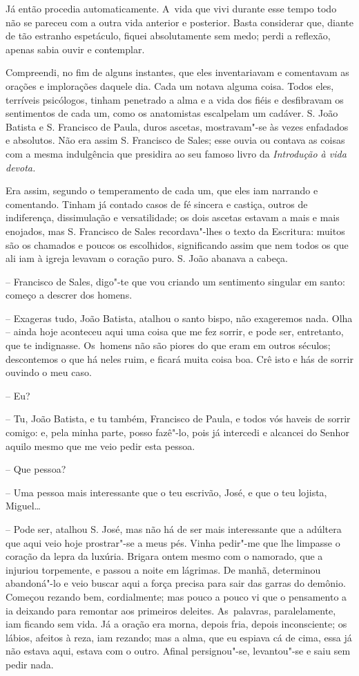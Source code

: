 Já então procedia automaticamente. A~vida que vivi durante esse tempo
todo não se pareceu com a outra vida anterior e posterior. Basta
considerar que, diante de tão estranho espetáculo, fiquei absolutamente
sem medo; perdi a reflexão, apenas sabia ouvir e contemplar.

Compreendi, no fim de alguns instantes, que eles inventariavam e
comentavam as orações e implorações daquele dia. Cada um notava alguma
coisa. Todos eles, terríveis psicólogos, tinham penetrado a alma e a
vida dos fiéis e desfibravam os sentimentos de cada um, como os
anatomistas escalpelam um cadáver. S. João Batista e S. Francisco de
Paula, duros ascetas, mostravam"-se às vezes enfadados e absolutos. Não
era assim S. Francisco de Sales; esse ouvia ou contava as coisas com a
mesma indulgência que presidira ao seu famoso livro da \emph{Introdução
à vida devota.}

Era assim, segundo o temperamento de cada um, que eles iam narrando e
comentando. Tinham já contado casos de fé sincera e castiça, outros de
indiferença, dissimulação e versatilidade; os dois ascetas estavam a
mais e mais enojados, mas S. Francisco de Sales recordava"-lhes o texto
da Escritura: muitos são os chamados e poucos os escolhidos,
significando assim que nem todos os que ali iam à igreja levavam o
coração puro. S. João abanava a cabeça.

-- Francisco de Sales, digo"-te que vou criando um sentimento singular em
santo: começo a descrer dos homens.

-- Exageras tudo, João Batista, atalhou o santo bispo, não exageremos
nada. Olha -- ainda hoje aconteceu aqui uma coisa que me fez sorrir, e
pode ser, entretanto, que te indignasse. Os~homens não são piores do que
eram em outros séculos; descontemos o que há neles ruim, e ficará muita
coisa boa. Crê isto e hás de sorrir ouvindo o meu caso.

-- Eu?

-- Tu, João Batista, e tu também, Francisco de Paula, e todos vós haveis
de sorrir comigo: e, pela minha parte, posso fazê"-lo, pois já intercedi
e alcancei do Senhor aquilo mesmo que me veio pedir esta pessoa.

-- Que pessoa?

-- Uma pessoa mais interessante que o teu escrivão, José, e que o teu
lojista, Miguel\ldots{}

-- Pode ser, atalhou S. José, mas não há de ser mais interessante que a
adúltera que aqui veio hoje prostrar"-se a meus pés. Vinha pedir"-me que
lhe limpasse o coração da lepra da luxúria. Brigara ontem mesmo com o
namorado, que a injuriou torpemente, e passou a noite em lágrimas. De
manhã, determinou abandoná"-lo e veio buscar aqui a força precisa para
sair das garras do demônio. Começou rezando bem, cordialmente; mas pouco
a pouco vi que o pensamento a ia deixando para remontar aos primeiros
deleites. As~palavras, paralelamente, iam ficando sem vida. Já a oração
era morna, depois fria, depois inconsciente; os lábios, afeitos à reza,
iam rezando; mas a alma, que eu espiava cá de cima, essa já não estava
aqui, estava com o outro. Afinal persignou"-se, levantou"-se e saiu sem
pedir nada.

